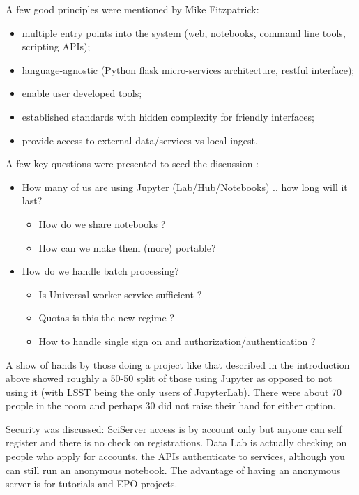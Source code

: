 \documentclass[11pt,twoside]{article}
\begin{document}
A few good principles were mentioned by Mike Fitzpatrick:
\begin{itemize}
\item multiple entry points into the system (web, notebooks, command line tools, scripting APIs);
\item language-agnostic (Python flask micro-services architecture, restful interface);
\item  enable user developed tools;
\item  established standards with hidden complexity for friendly interfaces;
\item  provide access to external data/services vs local ingest.
\end{itemize}


A few key questions were presented to seed the discussion :
\begin{itemize}
\item How many of us are using Jupyter (Lab/Hub/Notebooks) .. how long will it last?
        \begin{itemize}
        \item How do we share notebooks ?
        \item How can we make them (more) portable?
        \end{itemize}
\item How do we handle batch processing?
        \begin{itemize}
        \item Is Universal worker service sufficient ?
        \item Quotas is this the new regime ?
        \item How to handle single sign on and authorization/authentication ?
        \end{itemize}

\end{itemize}


A show of hands by those doing a project like that described in the introduction above  showed roughly a 50-50 split of those using Jupyter as opposed to not using it (with LSST being the only users of JupyterLab). There were about 70 people in the room and perhaps 30 did not raise their hand for either option.

Security was discussed:
SciServer access is by account only but anyone can self register and there is no check on registrations.
Data Lab  is actually checking on people who apply for accounts, the APIs authenticate to services, although you can still run an anonymous notebook. The advantage of having an anonymous server is for tutorials and EPO projects.
\end{document}
